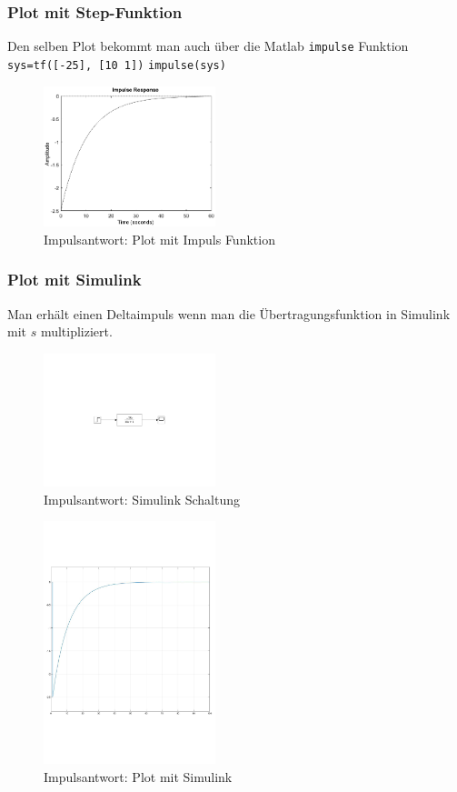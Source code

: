 \subsubsection{Plot mit Step-Funktion}
Den selben Plot bekommt man auch über die Matlab \texttt{impulse} Funktion\\
\texttt{sys=tf([-25], [10 1])}
\texttt{impulse(sys)}
\begin{figure}[H]
    \centering
    \includegraphics[width=5cm]{image/ImpulsantwortPlotmitImpulsFunktion.eps}
    \caption{Impulsantwort: Plot mit Impuls Funktion}
\end{figure}

\subsubsection{Plot mit Simulink}
Man erhält einen Deltaimpuls wenn man die Übertragungsfunktion in Simulink mit $s$ multipliziert.
\begin{figure}[H]
    \centering
    \includegraphics[width=5cm]{image/ImpulsantwortSimulinkSchaltung.pdf}
    \caption{Impulsantwort: Simulink Schaltung}
\end{figure}
\begin{figure}[H]
    \centering
    \includegraphics[width=5cm]{image/ImpulsantwortPlotmitSimulink.pdf}
    \caption{Impulsantwort: Plot mit Simulink}
\end{figure}
